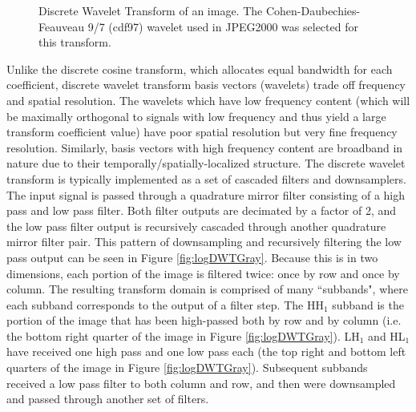 \documentclass[conference]{IEEEtran}
\begin{document}
\begin{figure}[htbp]
    \caption{Discrete Wavelet Transform of an image. The Cohen-Daubechies-Feauveau 9/7 (cdf97) wavelet used in JPEG2000 was selected for this transform.}
    \label{fig:dwtImage}
\end{figure}

Unlike the discrete cosine transform, which allocates equal bandwidth for each coefficient, discrete wavelet transform basis vectors (wavelets) trade off frequency and spatial resolution.
The wavelets which have low frequency content (which will be maximally orthogonal to signals with low frequency and thus yield a large transform coefficient value) have poor spatial resolution but very fine frequency resolution.
Similarly, basis vectors with high frequency content are broadband in nature due to their temporally/spatially-localized structure.
The discrete wavelet transform is typically implemented as a set of cascaded filters and downsamplers.
The input signal is passed through a quadrature mirror filter consisting of a high pass and low pass filter.
Both filter outputs are decimated by a factor of 2, and the low pass filter output is recursively cascaded through another quadrature mirror filter pair.
This pattern of downsampling and recursively filtering the low pass output can be seen in Figure \ref{fig:logDWTGray}.
Because this is in two dimensions, each portion of the image is filtered twice: once by row and once by column.
The resulting transform domain is comprised of many ``subbands", where each subband corresponds to the output of a filter step.
The HH$_1$ subband is the portion of the image that has been high-passed both by row and by column (i.e. the bottom right quarter of the image in Figure \ref{fig:logDWTGray}).
LH$_1$ and HL$_1$ have received one high pass and one low pass each (the top right and bottom left quarters of the image in Figure \ref{fig:logDWTGray}).
Subsequent subbands received a low pass filter to both column and row, and then were downsampled and passed through another set of filters.
\end{document}
